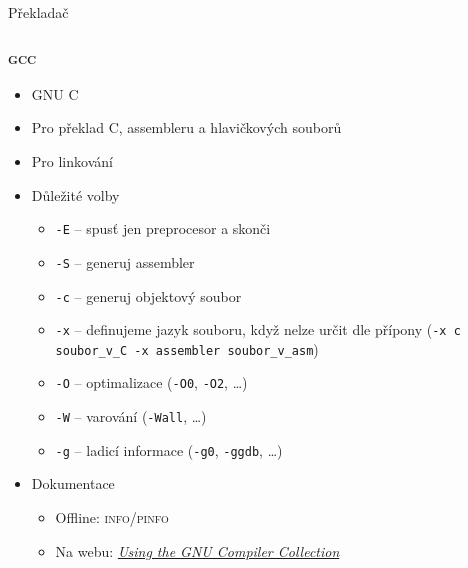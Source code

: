 
\begin{frame}[fragile]{Překladač}

  \begin{center}
    
  \end{center}

\end{frame}

\begin{frame}
  \frametitle{\textsc{gcc}}

  \begin{itemize}
    \item GNU C

    \pause

    \item Pro překlad C, assembleru a hlavičkových souborů

    \pause

    \item Pro linkování

    \pause

    \item Důležité volby
    \begin{itemize}
      \item \texttt{-E} -- spusť jen preprocesor a skonči
      \item \texttt{-S} -- generuj assembler
      \item \texttt{-c} -- generuj objektový soubor
      \item \texttt{-x} -- definujeme jazyk souboru, když nelze určit dle
	přípony (\texttt{-x c soubor\_v\_C -x assembler soubor\_v\_asm})
      \item \texttt{-O} -- optimalizace (\texttt{-O0}, \texttt{-O2}, \dots)
      \item \texttt{-W} -- varování (\texttt{-Wall}, \dots)
      \item \texttt{-g} -- ladicí informace (\texttt{-g0}, \texttt{-ggdb},
        \dots)
    \end{itemize}

    \pause

    \item Dokumentace
    \begin{itemize}
      \item Offline: \textsc{info}/\textsc{pinfo}
      \item Na webu: \href{https://gcc.gnu.org/onlinedocs/}{\textit{Using the
	GNU Compiler Collection}}
    \end{itemize}
  \end{itemize}

\end{frame}
